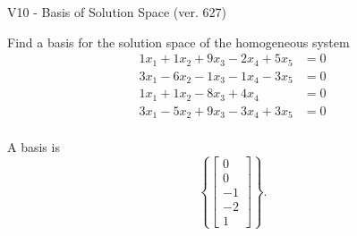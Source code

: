 \begin{exercise}
  \begin{exerciseTitle}V10 - Basis of Solution Space (ver. 627)\end{exerciseTitle}
  \begin{exerciseStatement}
    Find a basis for the solution space of the homogeneous system 
\begin{align*}
 1 x_ 1 + 1 x_ 2 + 9 x_ 3 -2 x_ 4 + 5 x_ 5 &= 0  \\ 
  3 x_ 1 -6 x_ 2 -1 x_ 3 -1 x_ 4 -3 x_ 5 &= 0  \\ 
  1 x_ 1 + 1 x_ 2 -8 x_ 3 + 4 x_ 4 &= 0  \\ 
  3 x_ 1 -5 x_ 2 + 9 x_ 3 -3 x_ 4 + 3 x_ 5 &= 0  \\ 
 \end{align*}


 
  \end{exerciseStatement}

  \begin{exerciseAnswer}
   A basis is   
\[\left\{\left[\begin{array}{c}
0 \\
0 \\
-1 \\
-2 \\
1
\end{array}\right]\right\}.\]

  


  \end{exerciseAnswer}
\end{exercise}